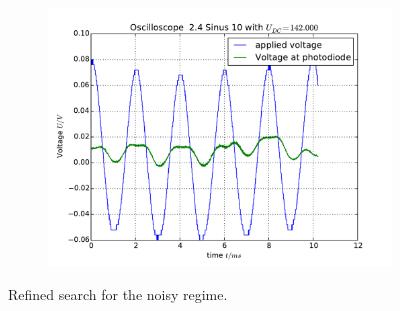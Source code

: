 \begin{figure}
\begin{subfigure}[b]{\picwidth}
        \caption{}
    \end{subfigure}
    \begin{subfigure}[b]{\picwidth}
        \includegraphics[width=\textwidth]{analysis/figures/24sinus10}
        \caption{}
    \end{subfigure}
    \caption{Refined search for the noisy regime.}
    \label{fig:sinus8}
\end{figure}

